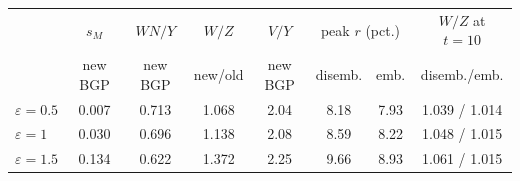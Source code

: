 \begin{tabular}{lccccccc}\toprule
 & $s_M$ & $WN/Y$ & $W/Z$ & $V/Y$ & \multicolumn{2}{c}{peak $r$ (pct.)} & $W/Z$ at $t=10$\\
 & new BGP & new BGP & new/old & new BGP & disemb. & emb. & disemb./emb.\\\midrule
$\varepsilon=0.5$ & 0.007 & 0.713 & 1.068 & 2.04 & 8.18 & 7.93 & 1.039 / 1.014\\
$\varepsilon=1$ & 0.030 & 0.696 & 1.138 & 2.08 & 8.59 & 8.22 & 1.048 / 1.015\\
$\varepsilon=1.5$ & 0.134 & 0.622 & 1.372 & 2.25 & 9.66 & 8.93 & 1.061 / 1.015\\
\bottomrule\end{tabular}
